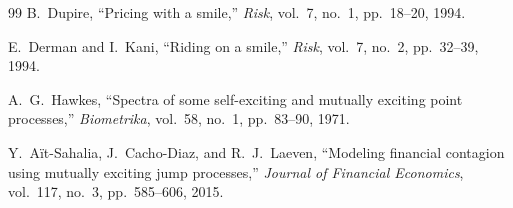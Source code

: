 \documentclass[conference]{IEEEtran}
\begin{document}
\begin{thebibliography}{99}
B.~Dupire,
``Pricing with a smile,''
\textit{Risk}, vol.~7, no.~1, pp.~18--20, 1994.

E.~Derman and I.~Kani,
``Riding on a smile,''
\textit{Risk}, vol.~7, no.~2, pp.~32--39, 1994.

A.~G.~Hawkes,
``Spectra of some self-exciting and mutually exciting point processes,''
\textit{Biometrika}, vol.~58, no.~1, pp.~83--90, 1971.

Y.~A{\"i}t-Sahalia, J.~Cacho-Diaz, and R.~J.~Laeven,
``Modeling financial contagion using mutually exciting jump processes,''
\textit{Journal of Financial Economics}, vol.~117, no.~3, pp.~585--606, 2015.

\end{thebibliography}
\end{document}

